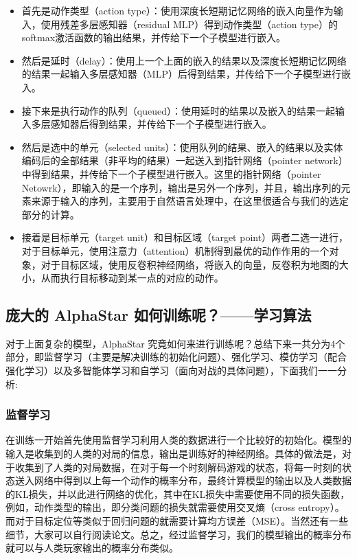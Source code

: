 \begin{itemize}
    \item 首先是动作类型（action type）：使用深度长短期记忆网络的嵌入向量作为输入，使用残差多层感知器（residual MLP）得到动作类型（action type）的softmax激活函数的输出结果，并传给下一个子模型进行嵌入。
    \item 然后是延时（delay）：使用上一个上面的嵌入的结果以及深度长短期记忆网络的结果一起输入多层感知器（MLP）后得到结果，并传给下一个子模型进行嵌入。
    \item 接下来是执行动作的队列（queued）：使用延时的结果以及嵌入的结果一起输入多层感知器后得到结果，并传给下一个子模型进行嵌入。
    \item 然后是选中的单元（selected units）：使用队列的结果、嵌入的结果以及实体编码后的全部结果（非平均的结果）一起送入到指针网络（pointer network）中得到结果，并传给下一个子模型进行嵌入。这里的指针网络（pointer Netowrk），即输入的是一个序列，输出是另外一个序列，并且，输出序列的元素来源于输入的序列，主要用于自然语言处理中，在这里很适合与我们的选定部分的计算。
    \item 接着是目标单元（target unit）和目标区域（target point）两者二选一进行，对于目标单元，使用注意力（attention）机制得到最优的动作作用的一个对象，对于目标区域，使用反卷积神经网络，将嵌入的向量，反卷积为地图的大小，从而执行目标移动到某一点的对应的动作。
\end{itemize}

\subsection{庞大的 AlphaStar 如何训练呢？——学习算法} 

对于上面复杂的模型，AlphaStar 究竟如何来进行训练呢？总结下来一共分为4个部分，即监督学习（主要是解决训练的初始化问题）、强化学习、模仿学习（配合强化学习）以及多智能体学习和自学习（面向对战的具体问题），下面我们一一分析:

\subsubsection{监督学习}

在训练一开始首先使用监督学习利用人类的数据进行一个比较好的初始化。模型的输入是收集到的人类的对局的信息，输出是训练好的神经网络。具体的做法是，对于收集到了人类的对局数据，在对于每一个时刻解码游戏的状态，将每一时刻的状态送入网络中得到以上每一个动作的概率分布，最终计算模型的输出以及人类数据的KL损失，并以此进行网络的优化，其中在KL损失中需要使用不同的损失函数，例如，动作类型的输出，即分类问题的损失就需要使用交叉熵（cross entropy）。而对于目标定位等类似于回归问题的就需要计算均方误差（MSE）。当然还有一些细节，大家可以自行阅读论文。总之，经过监督学习，我们的模型输出的概率分布就可以与人类玩家输出的概率分布类似。

